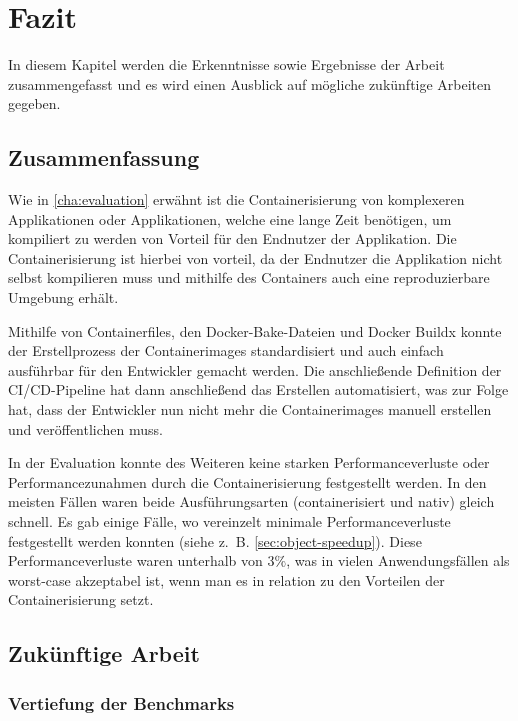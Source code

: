 \chapter{Fazit} \label{cha:conclusion}

In diesem Kapitel werden die Erkenntnisse sowie Ergebnisse der Arbeit zusammengefasst und es wird einen Ausblick auf mögliche zukünftige Arbeiten gegeben. 

\section{Zusammenfassung}

Wie in \cref{cha:evaluation} erwähnt ist die Containerisierung von komplexeren Applikationen oder Applikationen, welche eine lange Zeit benötigen, um kompiliert zu werden von Vorteil für den Endnutzer der Applikation. Die Containerisierung ist hierbei von vorteil, da der Endnutzer die Applikation nicht selbst kompilieren muss und mithilfe des Containers auch eine reproduzierbare Umgebung erhält. 

Mithilfe von Containerfiles, den Docker-Bake-Dateien und Docker Buildx konnte der Erstellprozess der Containerimages standardisiert und auch einfach ausführbar für den Entwickler gemacht werden. Die anschließende Definition der CI/CD-Pipeline hat dann anschließend das Erstellen automatisiert, was zur Folge hat, dass der Entwickler nun nicht mehr die Containerimages manuell erstellen und veröffentlichen muss. 

In der Evaluation konnte des Weiteren keine starken Performanceverluste oder Performancezunahmen durch die Containerisierung festgestellt werden. In den meisten Fällen waren beide Ausführungsarten (containerisiert und nativ) gleich schnell. Es gab einige Fälle, wo vereinzelt minimale Performanceverluste festgestellt werden konnten (siehe z. B. \cref{sec:object-speedup}). Diese Performanceverluste waren unterhalb von $3\%$, was in vielen Anwendungsfällen als worst-case akzeptabel ist, wenn man es in relation zu den Vorteilen der Containerisierung setzt.

\section{Zukünftige Arbeit}

\subsection{Vertiefung der Benchmarks}


